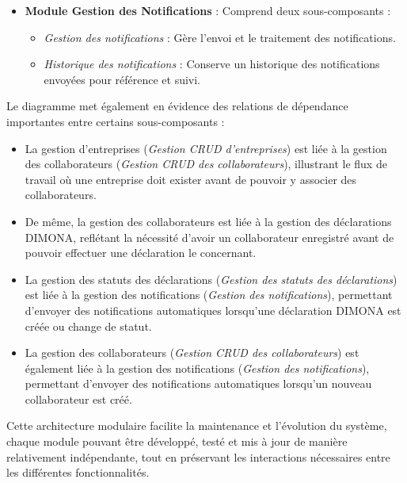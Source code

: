 \begin{itemize}[leftmargin=*,label=\textcolor{darkgray}{$\bullet$},itemsep=0.3em]
  \item \textbf{Module Gestion des Notifications} : Comprend deux sous-composants :
    \begin{itemize}[leftmargin=*,label=\textcolor{darkgray}{$\bullet$},itemsep=0.3em]
      \item \textit{Gestion des notifications} : Gère l'envoi et le traitement des notifications.
      \item \textit{Historique des notifications} : Conserve un historique des notifications envoyées pour référence et suivi.
    \end{itemize}
\end{itemize}

\vspace{0.5cm}

\noindent Le diagramme met également en évidence des relations de dépendance importantes entre certains sous-composants :
\begin{itemize}[leftmargin=*,label=\textcolor{darkgray}{$\bullet$},itemsep=0.3em]
  \item La gestion d'entreprises (\textit{Gestion CRUD d'entreprises}) est liée à la gestion des collaborateurs (\textit{Gestion CRUD des collaborateurs}), illustrant le flux de travail où une entreprise doit exister avant de pouvoir y associer des collaborateurs.
  \item De même, la gestion des collaborateurs est liée à la gestion des déclarations DIMONA, reflétant la nécessité d'avoir un collaborateur enregistré avant de pouvoir effectuer une déclaration le concernant.
  \item La gestion des statuts des déclarations (\textit{Gestion des statuts des déclarations}) est liée à la gestion des notifications (\textit{Gestion des notifications}), permettant d'envoyer des notifications automatiques lorsqu'une déclaration DIMONA est créée ou change de statut.
  \item La gestion des collaborateurs (\textit{Gestion CRUD des collaborateurs}) est également liée à la gestion des notifications (\textit{Gestion des notifications}), permettant d'envoyer des notifications automatiques lorsqu'un nouveau collaborateur est créé.
\end{itemize}

\vspace{0.5cm}

\begin{tcolorbox}[
  title={\textbf{Architecture modulaire de SecuCom}},
  colback=blue!5!white,
  colframe=primarycolor,
  fonttitle=\bfseries,
  boxrule=0.5mm,
  arc=2mm,
  left=6mm,
  right=6mm,
  top=6mm,
  bottom=6mm
]
Cette architecture modulaire facilite la maintenance et l'évolution du système, chaque module pouvant être développé, testé et mis à jour de manière relativement indépendante, tout en préservant les interactions nécessaires entre les différentes fonctionnalités.
\end{tcolorbox}
\newpage

